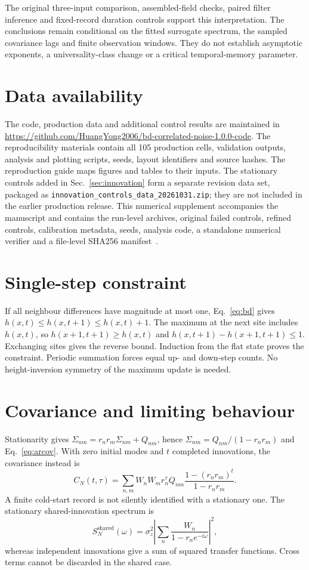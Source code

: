 The original three-input comparison, assembled-field checks, paired filter
inference and fixed-record duration controls support this interpretation.
The conclusions remain conditional on the fitted surrogate spectrum,
the sampled covariance lags and finite observation windows. They do not
establish asymptotic exponents, a universality-class change or a critical
temporal-memory parameter.

\section*{Data availability}
The code, production data and additional control results are maintained in
\url{https://github.com/HuangYong2006/bd-correlated-noise-1.0.0-code}.
The reproducibility materials contain all 105 production cells, validation
outputs, analysis and plotting scripts, seeds, layout identifiers and source
hashes. The reproduction guide maps figures and tables to their inputs.
The stationary controls added in Sec.~\ref{sec:innovation} form a separate
revision data set, packaged as \texttt{innovation\_controls\_data\_20261031.zip};
they are not included in the earlier production release.
This numerical supplement accompanies the manuscript and contains the
run-level archives, original failed controls, refined controls, calibration
metadata, seeds, analysis code, a standalone numerical verifier and a
file-level SHA256 manifest~\cite{SupplementalData}.

\appendix
\section{Single-step constraint}
\label{app:single}
If all neighbour differences have magnitude at most one, Eq.~\eqref{eq:bd}
gives $h(x,t)\le h(x,t+1)\le h(x,t)+1$. The maximum at the next site includes
$h(x,t)$, so $h(x+1,t+1)\ge h(x,t)$ and
$h(x,t+1)-h(x+1,t+1)\le1$. Exchanging sites gives the reverse bound.
Induction from the flat state proves the constraint. Periodic summation forces
equal up- and down-step counts. No height-inversion symmetry of the maximum
update is needed.

\section{Covariance and limiting behaviour}
\label{app:cov}
Stationarity gives $\Sigma_{nm}=r_nr_m\Sigma_{nm}+Q_{nm}$, hence
$\Sigma_{nm}=Q_{nm}/(1-r_nr_m)$ and Eq.~\eqref{eq:arcov}. With zero initial
modes and $t$ completed innovations, the covariance instead is
\begin{equation}
 C_N(t,\tau)=\sum_{n,m}W_nW_mr_n^\tau Q_{nm}
              \frac{1-(r_nr_m)^t}{1-r_nr_m}.
\end{equation}
A finite cold-start record is not silently identified with a stationary one.
The stationary shared-innovation spectrum is
\begin{equation}
 S_N^{\mathrm{shared}}(\omega)=\sigma_z^2
       \left|\sum_n\frac{W_n}{1-r_ne^{-i\omega}}\right|^2,
\end{equation}
whereas independent innovations give a sum of squared transfer functions.
Cross terms cannot be discarded in the shared case.

